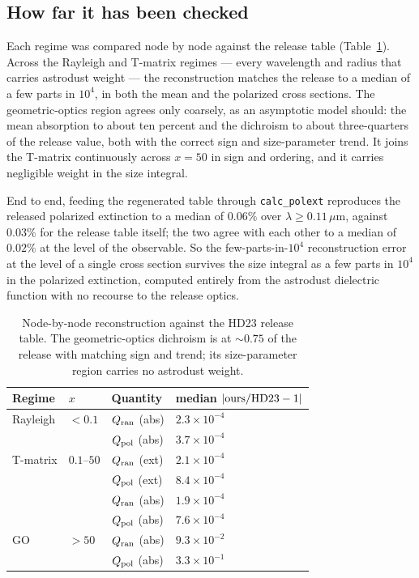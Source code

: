 \documentclass{my_memo}
\newcommand{\code}[1]{\texttt{#1}}
\newcommand{\um}{\ensuremath{\,\mu\mathrm{m}}}
\begin{document}
\subsection{How far it has been checked}\label{sec:fpcheck}

Each regime was compared node by node against the release table
(Table~\ref{tab:fpcheck}). Across the Rayleigh and T-matrix regimes --- every
wavelength and radius that carries astrodust weight --- the reconstruction
matches the release to a median of a few parts in $10^4$, in both the mean and
the polarized cross sections. The geometric-optics region agrees only coarsely,
as an asymptotic model should: the mean absorption to about ten percent and the
dichroism to about three-quarters of the release value, both with the correct
sign and size-parameter trend. It joins the T-matrix continuously across $x=50$
in sign and ordering, and it carries negligible weight in the size integral.

End to end, feeding the regenerated table through \code{calc\_polext} reproduces
the released polarized extinction to a median of $0.06\%$ over
$\lambda\ge0.11\um$, against $0.03\%$ for the release table itself; the two agree
with each other to a median of $0.02\%$ at the level of the observable. So the
few-parts-in-$10^4$ reconstruction error at the level of a single cross section
survives the size integral as a few parts in $10^4$ in the polarized extinction,
computed entirely from the astrodust dielectric function with no recourse to the
release optics.

\begin{table}[h]
\centering
\small
\begin{tabular}{llll}
\toprule
Regime & $x$ & Quantity & median $|{\rm ours}/{\rm HD23}-1|$ \\
\midrule
Rayleigh  & $<0.1$      & $Q_{\rm ran}$ (abs) & $2.3\times10^{-4}$ \\
          &             & $Q_{\rm pol}$ (abs) & $3.7\times10^{-4}$ \\
T-matrix  & $0.1$--$50$ & $Q_{\rm ran}$ (ext) & $2.1\times10^{-4}$ \\
          &             & $Q_{\rm pol}$ (ext) & $8.4\times10^{-4}$ \\
          &             & $Q_{\rm ran}$ (abs) & $1.9\times10^{-4}$ \\
          &             & $Q_{\rm pol}$ (abs) & $7.6\times10^{-4}$ \\
GO        & $>50$       & $Q_{\rm ran}$ (abs) & $9.3\times10^{-2}$ \\
          &             & $Q_{\rm pol}$ (abs) & $3.3\times10^{-1}$ \\
\bottomrule
\end{tabular}
\caption{Node-by-node reconstruction against the HD23 release table. The
geometric-optics dichroism is at $\sim0.75$ of the release with matching sign
and trend; its size-parameter region carries no astrodust weight.}
\label{tab:fpcheck}
\end{table}
\end{document}
